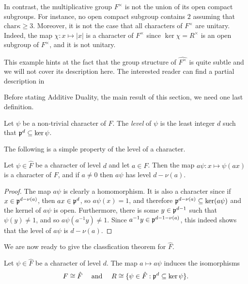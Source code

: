 \begin{example}
    In contrast, the multiplicative group $F^\times$ is not the union of its open compact subgroups. For instance, no open compact subgroup contains $2$ assuming that $\mathrm{char}\kappa\geq 3$. Moreover, it is not the case that all characters of $F^\times$ are unitary. Indeed, the map $\chi:x\mapsto|x|$ is a character of $F^{\times}$ since $\ker\chi=R^\times$ is an open subgroup of $F^\times$, and it is not unitary.

    This example hints at the fact that the group structure of $\hat{F^\times}$ is quite subtle and we will not cover its description here. The interested reader can find a partial description in \cite[\S 1.8]{BH1}
\end{example}


Before stating Additive Duality, the main result of this section, we need one last definition.

\begin{defn}
    Let $\psi$ be a non-trivial character of $F$. The \textit{level} of $\psi$ is the least integer $d$ such that $\mathfrak{p}^d\subseteq\ker\psi$.
\end{defn}

The following is a simple property of the level of a character.

\begin{lemma}
    Let $\psi\in\hat{F}$ be a character of level $d$ and let $a\in F$. Then the map $a\psi:x\mapsto\psi(ax)$ is a character of $F$, and if $a\neq0$ then $a\psi$ has level $d-\nu(a)$.
\end{lemma}
\begin{proof}
    The map $a\psi$ is clearly a homomorphism. It is also a character since if $x\in\mathfrak{p}^{d-\nu(a)}$, then $ax\in\mathfrak{p}^d$, so $a\psi(x)=1$, and therefore $\mathfrak{p}^{d-\nu(a)}\subseteq\ker(a\psi)$ and the kernel of $a\psi$ is open. Furthermore, there is some $y\in\mathfrak{p}^{d-1}$ such that $\psi(y)\neq1$, and so $a\psi(a^{-1}y)\neq1$. Since $a^{-1}y\in\mathfrak{p}^{d-1-\nu(a)}$, this indeed shows that the level of $a\psi$ is $d-\nu(a)$. 
\end{proof}

We are now ready to give the classfication theorem for $\hat{F}$.

\begin{thm}\label{add_dual}
    Let $\psi\in\hat{F}$ be a character of level $d$. The map $a\mapsto a\psi$ induces the isomorphisms 
    $$F\cong\hat{F} \quad\text{ and }\quad R\cong\{\psi\in\hat{F}:\mathfrak{p}^d\subseteq\ker\psi\}.$$  
\end{thm}

